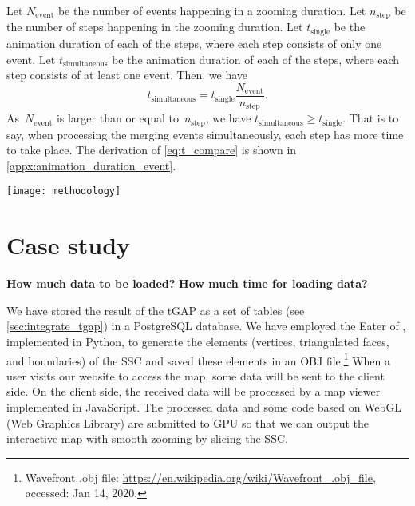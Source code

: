 \documentclass[twocolumn]{svjour3}          %
\begin{document}
Let $N_\mathrm{event}$ be the number of events happening in a zooming duration.
Let $n_\mathrm{step}$ be the number of steps happening in the zooming duration.
Let $t_\mathrm{single}$ be the animation duration of each of the steps,
where each step consists of only one event.
Let $t_\mathrm{simultaneous}$ be the animation duration of each of the steps,
where each step consists of at least one event.
Then, we have 
\begin{equation}
\label{eq:t_compare}
t_\mathrm{simultaneous} = t_\mathrm{single}  \frac{N_\mathrm{event}}{n_\mathrm{step}}.
\end{equation}
As~$N_\mathrm{event}$ is larger than or equal to~$n_\mathrm{step}$,
we have $t_\mathrm{simultaneous} \ge t_\mathrm{single}$.
That is to say, when processing the merging events simultaneously,
each step has more time to take place. 
The derivation of \eq\ref{eq:t_compare} is shown 
in \appx\ref{appx:animation_duration_event}.




\begin{figure*}[tb]
\centering
\texttt{[image: methodology]}
\caption{Our panel of settings. 
Among others, one can set how much to zoom when scrolling the mouse wheel 
and set the zooming duration. 
Note that if your computer does not have a discrete graphics card, 
then you may observe that the eating is flickering.
In order to avoid the flickering, 
one can set the opacity to 1 and uncheck the box for color adapting.}
\label{fig:interaction_settings}
\end{figure*}



\section{Case study}
\label{sec:case_study}


\textbf{How much data to be loaded?}
\textbf{How much time for loading data?}


We have stored the result of the tGAP 
as a set of tables (see \sect\ref{sec:integrate_tgap}) 
in a PostgreSQL database.
We have employed the Eater of \citet{Suba2014Merge},
implemented in Python, 
to generate the elements
(vertices, triangulated faces, and boundaries)
of the SSC \citep{vanOosterom2014tGAPSSC} 
and saved these elements in an OBJ file.\footnote{%
Wavefront .obj file:
\url{https://en.wikipedia.org/wiki/Wavefront_.obj_file},
accessed: Jan 14, 2020.}
%
When a user visits our website to access the map,
some data will be sent to the client side.  
On the client side,
the received data will be processed
by a map viewer implemented in JavaScript.
The processed data and some code based on WebGL (Web Graphics Library)
are submitted to GPU so that we can output the interactive map with smooth zooming
by slicing the SSC.
\end{document}
